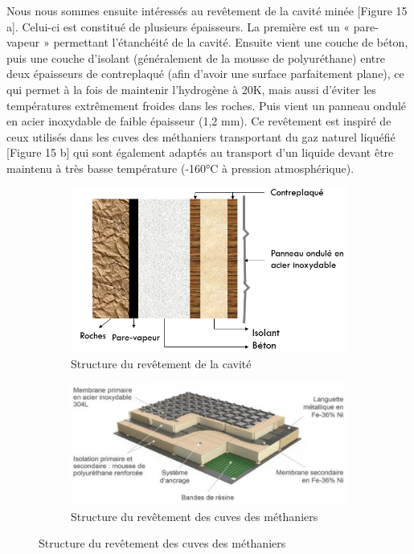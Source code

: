 \documentclass[11pt,french,a4paper]{article}
\begin{document}
Nous nous sommes ensuite intéressés au revêtement de la cavité minée [Figure 15 a]. Celui-ci est constitué de plusieurs épaisseurs. La première est un « pare-vapeur » permettant l’étanchéité de la cavité. Ensuite vient une couche de béton, puis une couche d’isolant (généralement de la mousse de polyuréthane) entre deux épaisseurs de contreplaqué (afin d’avoir une surface parfaitement plane), ce qui permet à la fois de maintenir l’hydrogène à 20K, mais aussi d’éviter les températures extrêmement froides dans les roches. Puis vient un panneau ondulé en acier inoxydable de faible épaisseur (1,2 mm).
Ce revêtement est inspiré de ceux utilisés dans les cuves des méthaniers transportant du gaz naturel liquéfié [Figure 15 b] qui sont également adaptés au transport d’un liquide devant être maintenu à très basse température (-160°C à pression atmosphérique).\\

\begin{figure}[h!]
\centering
\begin{subfigure}[b]{0.4\linewidth}
\includegraphics[width=\linewidth]{image/chap2/Figure 3.ii.2-3.png}
\caption{Structure du revêtement de la cavité}
\end{subfigure}
\begin{subfigure}[b]{0.4\linewidth}
\includegraphics[width=\linewidth]{image/chap2/Figure 3.ii.2-4.png}
\caption{Structure du revêtement des cuves des méthaniers}
\end{subfigure}
\end{figure}
\end{document}
